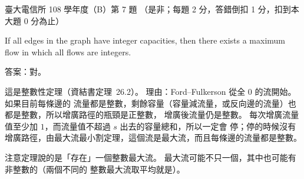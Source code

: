 \begin{pastexam}[label={px:ntu-108-comm-dsab-07}]{臺大電信所 108 學年度（B）第 7 題}
（是非；每題 2 分，答錯倒扣 1 分，扣到本大題 0 分為止）

If all edges in the graph have integer capacities, then there exists a maximum flow in which all
flows are integers.
\end{pastexam}

\begin{pastsoln}
答案：對。

這是整數性定理（資結書定理~26.2）。 理由：Ford--Fulkerson 從全 $0$ 的流開始。 如果目前每條邊的
流量都是整數，剩餘容量（容量減流量，或反向邊的流量）也都是整數，所以增廣路徑的瓶頸是正整數，
增廣後流量仍是整數。 每次增廣流量值至少加 $1$，而流量值不超過 $s$ 出去的容量總和，所以一定會
停；停的時候沒有增廣路徑，由最大流最小割定理，這個流是最大流，而且每條邊的流量都是整數。

注意定理說的是「存在」一個整數最大流。 最大流可能不只一個，其中也可能有非整數的（兩個不同的
整數最大流取平均就是）。
\end{pastsoln}
